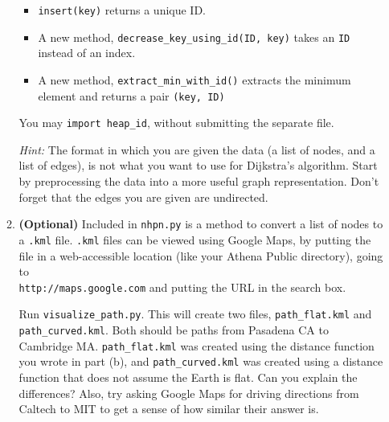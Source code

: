\documentclass[12pt,twoside]{article}
\begin{document}
\begin{enumerate}
\begin{enumerate}
    \begin{itemize}
    \item \verb|insert(key)| returns a unique ID.
    \item A new method, \verb|decrease_key_using_id(ID, key)| takes an
      \verb|ID| instead of an index.
    \item A new method, \verb|extract_min_with_id()| extracts the minimum
      element and returns a pair \verb|(key, ID)|
    \end{itemize}

    You may \verb|import heap_id|, without submitting the separate file.

    \emph{Hint:} The format in which you are given the data (a list of
    nodes, and a list of edges), is not what you want to use for
    Dijkstra's algorithm. Start by preprocessing the data into a more
    useful graph representation. Don't forget that the edges you are
    given are undirected.

  \item {\bf (Optional)} Included in \verb|nhpn.py| is a method to
    convert a list of nodes to a \verb|.kml| file. \verb|.kml| files
    can be viewed using Google Maps, by putting the file in a
    web-accessible location (like your Athena Public directory), going
    to \\ \verb|http://maps.google.com| and putting the URL in the
    search box.

    Run \verb|visualize_path.py|. This will create two files,
    \verb|path_flat.kml| and \\ \verb|path_curved.kml|. Both should be
    paths from Pasadena CA to Cambridge MA. \verb|path_flat.kml| was
    created using the distance function you wrote in part (b), and
    \verb|path_curved.kml| was created using a distance function that
    does not assume the Earth is flat. Can you explain the
    differences? Also, try asking Google Maps for driving directions
    from Caltech to MIT to get a sense of how similar their answer is.

  \end{enumerate}

\end{enumerate}
\end{document}
